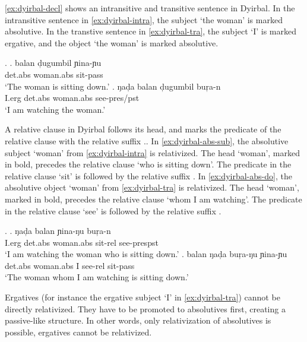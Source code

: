 \ref{ex:dyirbal-decl} shows an intransitive and transitive sentence in Dyirbal. In the intransitive sentence in \ref{ex:dyirbal-intra}, the subject  `the woman' is marked absolutive. In the transtive sentence in \ref{ex:dyirbal-tra}, the subject  `I' is marked ergative, and the object  `the woman' is marked absolutive.

\ex.\label{ex:dyirbal-decl}
\ag. balan d̦ugumbil ɲina-ɲu\\
 \ac{det}.\ac{abs} woman.\ac{abs} sit-\ac{pass}\\
 `The woman is sitting down.'\label{ex:dyirbal-intra}
\bg. ŋad̦a balan d̦ugumbil buŗa-n\\
 I.\ac{erg} \ac{det}.\ac{abs} woman.\ac{abs} see-\ac{pres}/\ac{pst}\\
 `I am watching the woman.'\label{ex:dyirbal-tra}

A relative clause in Dyirbal follows its head, and marks the predicate of the relative clause with the relative suffix ..
In \ref{ex:dyirbal-abs-sub}, the absolutive subject  `woman' from \ref{ex:dyirbal-intra} is relativized. The head  `woman', marked in bold, precedes the relative clause  `who is sitting down'. The predicate in the relative clause  `sit' is followed by the relative suffix .
In \ref{ex:dyirbal-abs-do}, the absolutive object  `woman' from \ref{ex:dyirbal-tra} is relativized. The head  `woman', marked in bold, precedes the relative clause  `whom I am watching'. The predicate in the relative clause  `see' is followed by the relative suffix .

\ex.
\ag. ŋad̦a balan  ɲina-ŋu buŗa-n\\
 I.\ac{erg} \ac{det}.\ac{abs} woman.\ac{abs} sit-\ac{rel} see-\ac{pres}\ac{pst}\\
 `I am watching the woman who is sitting down.'\label{ex:dyirbal-abs-sub}
\bg. balan  ŋad̦a buŗa-ŋu ɲina-ɲu\\
 \ac{det}.\ac{abs} woman.\ac{abs} I see-\ac{rel} sit-\ac{pass}\\
 `The woman whom I am watching is sitting down.'\label{ex:dyirbal-abs-do}

Ergatives (for instance the ergative subject  `I' in \ref{ex:dyirbal-tra}) cannot be directly relativized. They have to be promoted to absolutives first, creating a passive-like structure. In other words, only relativization of absolutives is possible, ergatives cannot be relativized.

